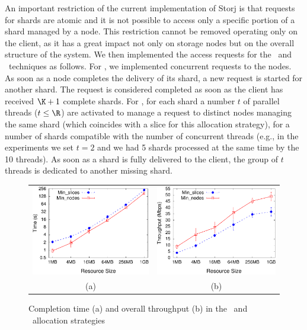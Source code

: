 {An important restriction of the current implementation of Storj is
that requests for shards are atomic and it is not possible to access
only a specific portion of a shard managed by a node. This restriction
cannot be removed operating only on the client, as it has a great
impact not only on storage nodes but on the overall structure of the
system.  We then implemented the access requests for the
\diagonal\ and \compact\ techniques as follows.  For \compact, we
implemented concurrent requests to the nodes. As soon as a node
completes the delivery of its shard, a new request is started for
another shard. The request is considered completed as soon as the
client has received $\K+1$ complete shards. For \diagonal, for each
shard a number $t$ of parallel threads ($t \leq \R$) are activated to
manage a request to distinct nodes managing the same shard (which
coincides with a slice for this allocation strategy), for a number of
shards compatible with the number of concurrent threads (e.g., in the
experiments we set $t=2$ and we had 5 shards processed at the same
time by the 10 threads). As soon as a shard is fully delivered to the
client, the group of $t$ threads is dedicated to another missing
shard.

\begin{figure}[!t]
	\centering
	\hspace*{-8pt}
       \begin{tabular}{cc} \includegraphics[width=0.475\columnwidth]{./figures/bdfprs-fig09a} &
\includegraphics[width=0.475\columnwidth]{./figures/bdfprs-fig09b}\\[-3pt]
           \footnotesize{\hspace*{16pt}(a)} & \footnotesize{\hspace*{16pt}(b)}\\
       \end{tabular}
   \caption{\label{dcs:fig:exp1}Completion time (a) and overall throughput (b)
   in the \diagonal\ and \compact\ allocation strategies}
\end{figure}


}

